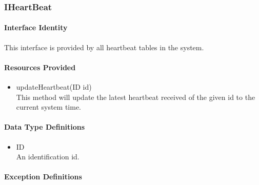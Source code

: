 \subsubsection{IHeartBeat}
\paragraph{Interface Identity}
This interface is provided by all heartbeat tables in the system.
\paragraph{Resources Provided}
\begin{itemize}
	\item{updateHeartbeat(ID id)}\\
	This method will update the latest heartbeat received of the
		given id to the current system time.
\end{itemize}
\paragraph{Data Type Definitions}
\begin{itemize}
	\item ID\\
	An identification id.
\end{itemize}
\paragraph{Exception Definitions}
